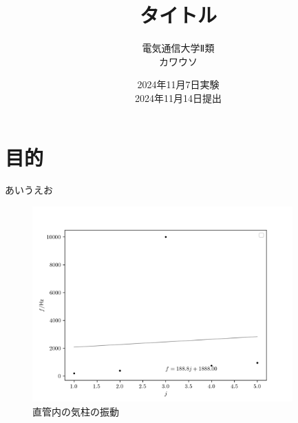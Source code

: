 \documentclass[head_space=20.mm,foot_space=20.mm]{jlreq}
\begin{document}
\title{タイトル}
\author{電気通信大学Ⅱ類\\カワウソ}
\date{2024年11月7日実験\\2024年11月14日提出}
\maketitle


\section{目的}
あいうえお

\begin{figure}[H]
  \begin{center}
  \includegraphics[width=100mm]{mokushi.png}
  \caption{直管内の気柱の振動}
  \label{fig:直管}
  \end{center}
\end{figure}
\end{document}
